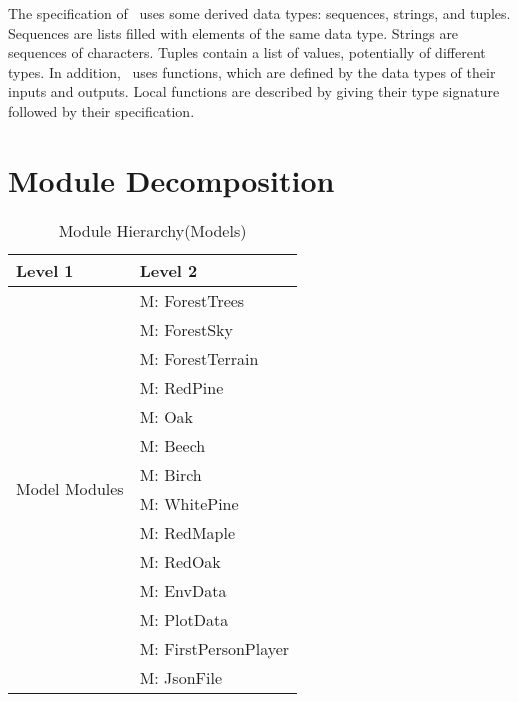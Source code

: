 \documentclass[12pt, titlepage]{article}
\newcounter{mnum}
\newcommand{\mthemnum}{M\themnum}
\begin{document}
\noindent
The specification of \progname \ uses some derived data types: sequences, strings, and
tuples. Sequences are lists filled with elements of the same data type. Strings
are sequences of characters. Tuples contain a list of values, potentially of
different types. In addition, \progname \ uses functions, which
are defined by the data types of their inputs and outputs. Local functions are
described by giving their type signature followed by their specification.

\newpage

\section{Module Decomposition}

\begin{table}[H]
\caption{Module Hierarchy(Models)}
\label{TblModels}

\centering
\begin{tabular}{p{} p{}}
\toprule
\textbf{Level 1} & \textbf{Level 2}\\
\midrule

\multirow{14}{0.3\textwidth}{Model Modules}
& {mnum} \mthemnum \label{Model1}: ForestTrees \\
& {mnum} \mthemnum \label{Model2}: ForestSky  \\
& {mnum} \mthemnum \label{Model3}: ForestTerrain \\
& {mnum} \mthemnum \label{Model4}: RedPine  \\
& {mnum} \mthemnum \label{Model5}: Oak   \\
& {mnum} \mthemnum \label{Model6}: Beech  \\
& {mnum} \mthemnum \label{Model7}: Birch  \\ 
& {mnum} \mthemnum \label{Model8}: WhitePine  \\
& {mnum} \mthemnum \label{Model9}: RedMaple \\
& {mnum} \mthemnum \label{Model10}: RedOak  \\
& {mnum} \mthemnum \label{Model11}: EnvData  \\
& {mnum} \mthemnum \label{Model12}: PlotData  \\
& {mnum} \mthemnum \label{Model13}: FirstPersonPlayer  \\
& {mnum} \mthemnum \label{Model14}: JsonFile  \\
\bottomrule

\end{tabular}
\end{table}
\end{document}
